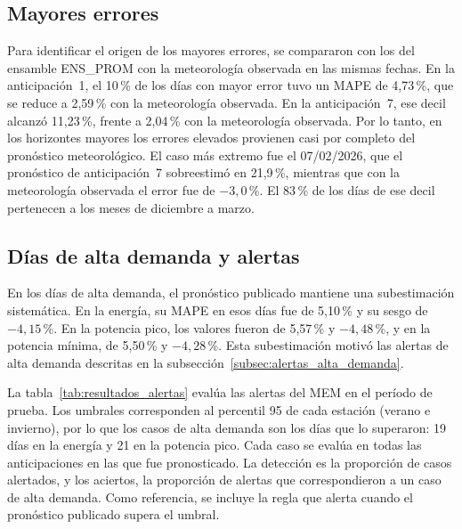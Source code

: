 \subsection{Mayores errores}

Para identificar el origen de los mayores errores, se compararon con los del ensamble ENS\_PROM con la meteorología observada en las mismas fechas. En la anticipación~1, el 10\,\% de los días con mayor error tuvo un MAPE de 4,73\,\%, que se reduce a 2,59\,\% con la meteorología observada. En la anticipación~7, ese decil alcanzó 11,23\,\%, frente a 2,04\,\% con la meteorología observada. Por lo tanto, en los horizontes mayores los errores elevados provienen casi por completo del pronóstico meteorológico. El caso más extremo fue el 07/02/2026, que el pronóstico de anticipación~7 sobreestimó en 21,9\,\%, mientras que con la meteorología observada el error fue de $-3{,}0$\,\%. El 83\,\% de los días de ese decil pertenecen a los meses de diciembre a marzo.

\subsection{Días de alta demanda y alertas}

En los días de alta demanda, el pronóstico publicado mantiene una subestimación sistemática. En la energía, su MAPE en esos días fue de 5,10\,\% y su sesgo de $-4{,}15$\,\%. En la potencia pico, los valores fueron de 5,57\,\% y $-4{,}48$\,\%, y en la potencia mínima, de 5,50\,\% y $-4{,}28$\,\%. Esta subestimación motivó las alertas de alta demanda descritas en la subsección~\ref{subsec:alertas_alta_demanda}.

La tabla~\ref{tab:resultados_alertas} evalúa las alertas del MEM en el período de prueba. Los umbrales corresponden al percentil 95 de cada estación (verano e invierno), por lo que los casos de alta demanda son los días que lo superaron: 19 días en la energía y 21 en la potencia pico. Cada caso se evalúa en todas las anticipaciones en las que fue pronosticado. La detección es la proporción de casos alertados, y los aciertos, la proporción de alertas que correspondieron a un caso de alta demanda. Como referencia, se incluye la regla que alerta cuando el pronóstico publicado supera el umbral.

